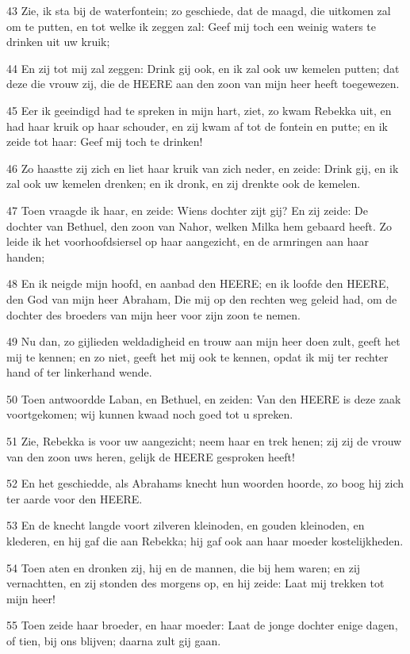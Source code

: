 \par 43 Zie, ik sta bij de waterfontein; zo geschiede, dat de maagd, die uitkomen zal om te putten, en tot welke ik zeggen zal: Geef mij toch een weinig waters te drinken uit uw kruik;
\par 44 En zij tot mij zal zeggen: Drink gij ook, en ik zal ook uw kemelen putten; dat deze die vrouw zij, die de HEERE aan den zoon van mijn heer heeft toegewezen.
\par 45 Eer ik geeindigd had te spreken in mijn hart, ziet, zo kwam Rebekka uit, en had haar kruik op haar schouder, en zij kwam af tot de fontein en putte; en ik zeide tot haar: Geef mij toch te drinken!
\par 46 Zo haastte zij zich en liet haar kruik van zich neder, en zeide: Drink gij, en ik zal ook uw kemelen drenken; en ik dronk, en zij drenkte ook de kemelen.
\par 47 Toen vraagde ik haar, en zeide: Wiens dochter zijt gij? En zij zeide: De dochter van Bethuel, den zoon van Nahor, welken Milka hem gebaard heeft. Zo leide ik het voorhoofdsiersel op haar aangezicht, en de armringen aan haar handen;
\par 48 En ik neigde mijn hoofd, en aanbad den HEERE; en ik loofde den HEERE, den God van mijn heer Abraham, Die mij op den rechten weg geleid had, om de dochter des broeders van mijn heer voor zijn zoon te nemen.
\par 49 Nu dan, zo gijlieden weldadigheid en trouw aan mijn heer doen zult, geeft het mij te kennen; en zo niet, geeft het mij ook te kennen, opdat ik mij ter rechter hand of ter linkerhand wende.
\par 50 Toen antwoordde Laban, en Bethuel, en zeiden: Van den HEERE is deze zaak voortgekomen; wij kunnen kwaad noch goed tot u spreken.
\par 51 Zie, Rebekka is voor uw aangezicht; neem haar en trek henen; zij zij de vrouw van den zoon uws heren, gelijk de HEERE gesproken heeft!
\par 52 En het geschiedde, als Abrahams knecht hun woorden hoorde, zo boog hij zich ter aarde voor den HEERE.
\par 53 En de knecht langde voort zilveren kleinoden, en gouden kleinoden, en klederen, en hij gaf die aan Rebekka; hij gaf ook aan haar moeder kostelijkheden.
\par 54 Toen aten en dronken zij, hij en de mannen, die bij hem waren; en zij vernachtten, en zij stonden des morgens op, en hij zeide: Laat mij trekken tot mijn heer!
\par 55 Toen zeide haar broeder, en haar moeder: Laat de jonge dochter enige dagen, of tien, bij ons blijven; daarna zult gij gaan.
